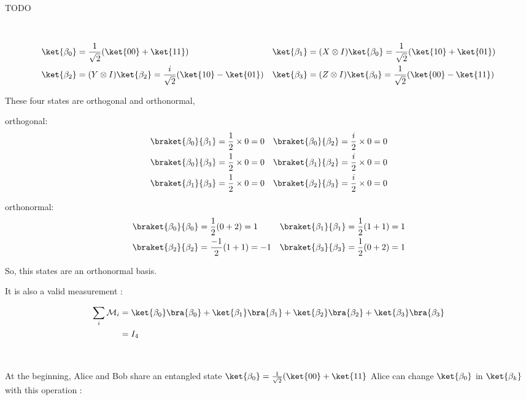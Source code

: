 ~

TODO

~

\begin{align*}
  \ket{\beta_0} &= \frac{1}{\sqrt 2}(\ket{00} + \ket{11})
  &\ket{\beta_1} &= (X \otimes I)\ket{\beta_0} =
    \frac{1}{\sqrt 2}(\ket{10}+\ket{01}) \\
  \ket{\beta_2} &= (Y \otimes I)\ket{\beta_2} =
    \frac{i}{\sqrt 2}(\ket{10} - \ket{01})
  &\ket{\beta_3} &= (Z \otimes I)\ket{\beta_0} =
    \frac{1}{\sqrt 2}(\ket{00}-\ket{11})
\end{align*}

These four states are orthogonal and orthonormal,

orthogonal:
\begin{align*}
  \braket{\beta_0}{\beta_1} &= \frac 1 2 \times 0 = 0 &
  \braket{\beta_0}{\beta_2} &= \frac i 2 \times 0 = 0 \\
  \braket{\beta_0}{\beta_3} &= \frac 1 2 \times 0 = 0 &
  \braket{\beta_1}{\beta_2} &= \frac i 2 \times 0 = 0 \\
  \braket{\beta_1}{\beta_3} &= \frac 1 2 \times 0 = 0 &
  \braket{\beta_2}{\beta_3} &= \frac i 2 \times 0 = 0
\end{align*}

orthonormal:
\begin{align*}
  \braket{\beta_0}{\beta_0} &= \frac 1 2 (0 + 2) = 1 &
  \braket{\beta_1}{\beta_1} &= \frac 1 2 (1 + 1) = 1 \\
  \braket{\beta_2}{\beta_2} &= \frac{-1}{2} (1 + 1) = -1 &
  \braket{\beta_3}{\beta_3} &= \frac 1 2 (0 + 2) = 1 \\
\end{align*}

So, this states are an orthonormal basis.

It is also a valid measurement :

\begin{align*}
  \sum_i \mathcal M _i &=
  \ket {\beta_0} \bra {\beta_0} + \ket {\beta_1} \bra {\beta_1} +
  \ket {\beta_2} \bra {\beta_2} + \ket {\beta_3} \bra {\beta_3} \\
  &= I_4
\end{align*}

~

At the beginning, Alice and Bob share an entangled state $\ket{\beta_0} = \frac
1 {\sqrt 2}(\ket{00} + \ket{11}$ Alice can change $\ket{\beta_0}$ in $\ket
{\beta_k}$ with this operation :

